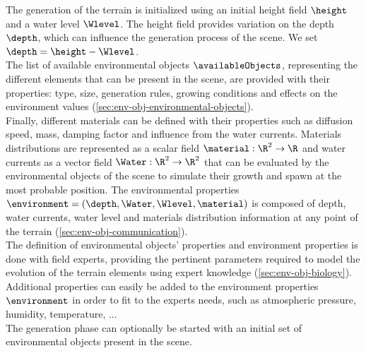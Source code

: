 The generation of the terrain is initialized using an initial height field $\height$ and a water level $\Wlevel$. The height field provides variation on the depth $\depth$, which can influence the generation process of the scene. We set $\depth = \height - \Wlevel$. \\
The list of available environmental objects $\availableObjects$, representing the different elements that can be present in the scene, are provided with their properties: type, size, generation rules, growing conditions and effects on the environment values (\cref{sec:env-obj-environmental-objects}). \\
Finally, different materials can be defined with their properties such as diffusion speed, mass, damping factor and influence from the water currents. Materials distributions are represented as a scalar field $\material: \R^2 \to \R$ and water currents as a vector field $\Water: \R^2 \to \R^2$ that can be evaluated by the environmental objects of the scene to simulate their growth and spawn at the most probable position. The environmental properties $\environment = (\depth, \Water, \Wlevel, \material)$ is composed of depth, water currents, water level and materials distribution information at any point of the terrain (\cref{sec:env-obj-communication}). \\
The definition of environmental objects' properties and environment properties is done with field experts, providing the pertinent parameters required to model the evolution of the terrain elements using expert knowledge (\cref{sec:env-obj-biology}). Additional properties can easily be added to the environment properties $\environment$ in order to fit to the experts needs, such as atmospheric pressure, humidity, temperature, ... \\
The generation phase can optionally be started with an initial set of environmental objects present in the scene. 

